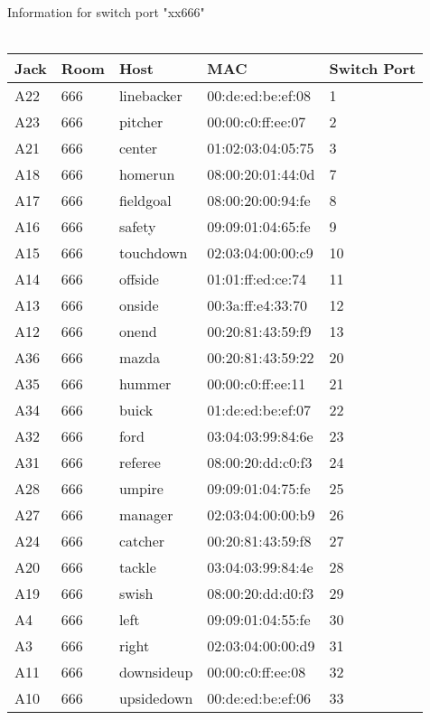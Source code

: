 \documentclass{article}
\begin{document}
\\
\\
Information for switch port "xx666"
\\
\\
\begin{tabular}{| l | l | l | l | l |}
\hline
Jack & Room & Host & MAC & Switch Port \\
\hline
A22 & 666 & linebacker & 00:de:ed:be:ef:08 & 1 \\
\hline
A23 & 666 & pitcher & 00:00:c0:ff:ee:07 & 2 \\
\hline
A21 & 666 & center & 01:02:03:04:05:75 & 3 \\
\hline
A18 & 666 & homerun & 08:00:20:01:44:0d & 7 \\
\hline
A17 & 666 & fieldgoal & 08:00:20:00:94:fe & 8 \\
\hline
A16 & 666 & safety & 09:09:01:04:65:fe & 9 \\
\hline
A15 & 666 & touchdown & 02:03:04:00:00:c9 & 10 \\
\hline
A14 & 666 & offside & 01:01:ff:ed:ce:74 & 11 \\
\hline
A13 & 666 & onside & 00:3a:ff:e4:33:70 & 12 \\
\hline
A12 & 666 & onend & 00:20:81:43:59:f9 & 13 \\
\hline
A36 & 666 & mazda & 00:20:81:43:59:22 & 20 \\
\hline
A35 & 666 & hummer & 00:00:c0:ff:ee:11 & 21 \\
\hline
A34 & 666 & buick & 01:de:ed:be:ef:07 & 22 \\
\hline
A32 & 666 & ford & 03:04:03:99:84:6e & 23 \\
\hline
A31 & 666 & referee & 08:00:20:dd:c0:f3 & 24 \\
\hline
A28 & 666 & umpire & 09:09:01:04:75:fe & 25 \\
\hline
A27 & 666 & manager & 02:03:04:00:00:b9 & 26 \\
\hline
A24 & 666 & catcher & 00:20:81:43:59:f8 & 27 \\
\hline
A20 & 666 & tackle & 03:04:03:99:84:4e & 28 \\
\hline
A19 & 666 & swish & 08:00:20:dd:d0:f3 & 29 \\
\hline
A4 & 666 & left & 09:09:01:04:55:fe & 30 \\
\hline
A3 & 666 & right & 02:03:04:00:00:d9 & 31 \\
\hline
A11 & 666 & downsideup & 00:00:c0:ff:ee:08 & 32 \\
\hline
A10 & 666 & upsidedown & 00:de:ed:be:ef:06 & 33 \\

\end{tabular}
\end{document}
